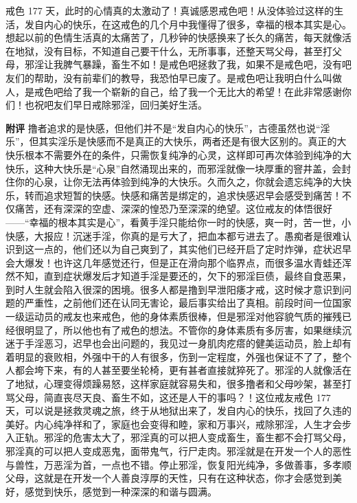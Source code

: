 \begin{case}
    戒色 177 天，此时的心情真的太激动了！真诚感恩戒色吧！从没体验过这样的生活，发自内心的快乐，在这戒色的几个月中我懂得了很多，幸福的根本其实是心。想起以前的色情生活真的太痛苦了，几秒钟的快感换来了长久的痛苦，每天就像活在地狱，没有目标，不知道自己要干什么，无所事事，还整天骂父母，甚至打父母，邪淫让我脾气暴躁，畜生不如！是戒色吧拯救了我，如果不是戒色吧，没有吧友们的帮助，没有前辈们的教导，我恐怕早已废了。是戒色吧让我明白什么叫做人，是戒色吧给了我一个崭新的自己，给了我一个无比大的希望！在此非常感谢你们！也祝吧友们早日戒除邪淫，回归美好生活。

    \textbf{附评} 撸者追求的是快感，但他们并不是“发自内心的快乐”，古德虽然也说“淫乐”，但其实淫乐是快感而不是真正的大快乐，两者还是有很大区别的。真正的大快乐根本不需要外在的条件，只需恢复纯净的心灵，这样即可再次体验到纯净的大快乐，这种大快乐是“心泉”自然涌现出来的，而邪淫就像一块厚重的窨井盖，会封住你的心泉，让你无法再体验到纯净的大快乐。久而久之，你就会遗忘纯净的大快乐，转而追求短暂的快感。快感和痛苦是绑定的，追求快感迟早会感受到痛苦！不仅痛苦，还有深深的空虚、深深的惶恐乃至深深的绝望。这位戒友的体悟很好——“幸福的根本其实是心”，看黄手淫只能给你一时的快感，爽一时，苦一世，小快感，大报应！沉迷手淫，你真的是亏大了，把血本都亏进去了。愚痴者是很难认识到这一点的，他们还以为自己爽到了，其实他们已经开启了定时炸弹，症状迟早会大爆发！也许这几年感觉还行，但是正在滑向那个临界点，而很多温水青蛙还浑然不知，直到症状爆发后才知道手淫是要还的，欠下的邪淫巨债，最终自食恶果，到时人生就会陷入很深的困境。很多人都是撸到早泄阳痿才戒，这时候才意识到问题的严重性，之前他们还在认同无害论，最后事实给出了真相。前段时间一位国家一级运动员的戒友也来戒色，他的身体素质很棒，但是邪淫对他容貌气质的摧残已经很明显了，所以他也有了戒色的想法。不管你的身体素质有多厉害，如果继续沉迷于手淫恶习，迟早也会出问题的，我见过一身肌肉疙瘩的健美运动员，脸上却有着明显的衰败相，外强中干的人有很多，伤到一定程度，外强也保证不了了，整个人都会垮下来，有的人甚至要坐轮椅，更有甚者直接就猝死了。邪淫的人就像活在了地狱，心理变得烦躁易怒，这样家庭就容易失和，很多撸者和父母吵架，甚至打骂父母，简直丧尽天良、畜生不如，这还是人干的事吗？！这位戒友戒色 177 天，可以说是拯救灵魂之旅，终于从地狱出来了，发自内心的快乐，找回了久违的美好。内心纯净祥和了，家庭也会变得和睦，家和万事兴，戒除邪淫，人生才会步入正轨。邪淫的危害太大了，邪淫真的可以把人变成畜生，畜生都不会打骂父母，邪淫真的可以把人变成恶鬼，面带鬼气，行尸走肉。邪淫就是在开发一个人的恶性与兽性，万恶淫为首，一点也不错。停止邪淫，恢复阳光纯净，多做善事，多孝顺父母，这就是在开发一个人善良淳厚的天性，只有在这种状态，你才会感觉到美好，感觉到快乐，感觉到一种深深的和谐与圆满。
\end{case}

